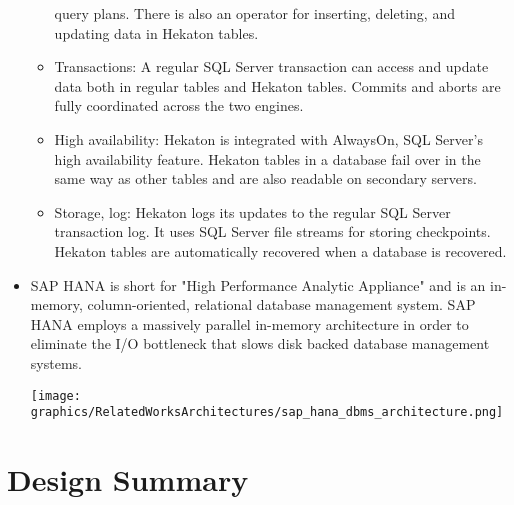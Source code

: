 \documentclass[letterpaper, 12pt]{article}
\renewcommand{\includegraphics}[2][]{\fbox{}}
\begin{document}
\begin{itemize}
\begin{itemize}
		query plans. There is also an operator for inserting, deleting,
		and updating data in Hekaton tables.
		\item Transactions: A regular SQL Server transaction can access
		and update data both in regular tables and Hekaton tables.
		Commits and aborts are fully coordinated across the two engines.
		\item High availability: Hekaton is integrated with AlwaysOn,
		SQL Server’s high availability feature. Hekaton tables in a database
		fail over in the same way as other tables and are also
		readable on secondary servers.
		\item Storage, log: Hekaton logs its updates to the regular SQL
		Server transaction log. It uses SQL Server file streams for storing
		checkpoints. Hekaton tables are automatically recovered
		when a database is recovered. 
	  \end{itemize} \cite{hekaton}
	  
	  \item SAP HANA
	  is short for "High Performance Analytic Appliance" and is an in-memory,
	  column-oriented, relational database management system. SAP HANA employs a
	  massively parallel in-memory architecture in order to eliminate the I/O bottleneck
	  that slows disk backed database management systems.
	  \par\vspace{\baselineskip} 
	  \texttt{[image: graphics/RelatedWorksArchitectures/sap\_hana\_dbms\_architecture.png]}
	  \cite{saphana}
	  \par\vspace{\baselineskip}
	\end{itemize}	
	
\newpage

\section{Design Summary}
\end{document}
